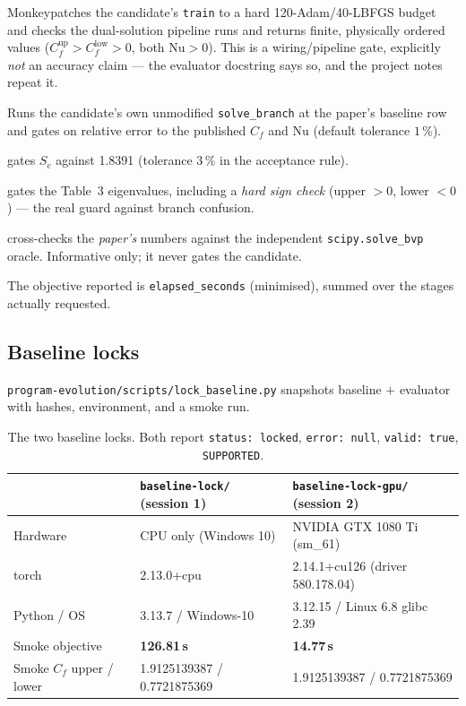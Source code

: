 \documentclass[11pt,a4paper]{article}
\newcommand{\code}[1]{\texttt{\small #1}}
\newcommand{\pct}{\,\%}
\begin{document}
\begin{description}[leftmargin=1.6em,itemsep=2pt]
  \item[\code{--mode smoke} (default, cheap).] Monkeypatches the candidate's \code{train}
        to a hard 120-Adam/40-LBFGS budget and checks the dual-solution pipeline runs and
        returns finite, physically ordered values ($C_f^{\mathrm{up}} > C_f^{\mathrm{low}} > 0$,
        both $\mathrm{Nu}>0$). This is a wiring/pipeline gate, explicitly \emph{not} an
        accuracy claim --- the evaluator docstring says so, and the project notes repeat it.
  \item[\code{--mode full} (expensive).] Runs the candidate's own unmodified
        \code{solve\_branch} at the paper's baseline row and gates on relative error to the
        published $C_f$ and $\mathrm{Nu}$ (default tolerance $1\pct$).
  \item[\code{--fold}] gates $S_c$ against 1.8391 (tolerance $3\pct$ in the acceptance rule).
  \item[\code{--stability}] gates the Table~3 eigenvalues, including a \emph{hard sign
        check} (upper $>0$, lower $<0$) --- the real guard against branch confusion.
  \item[\code{--oracle}] cross-checks the \emph{paper's} numbers against the independent
        \code{scipy.solve\_bvp} oracle. Informative only; it never gates the candidate.
\end{description}

\noindent The objective reported is \code{elapsed\_seconds} (minimised), summed over the
stages actually requested.

\subsection{Baseline locks}
\code{program-evolution/scripts/lock\_baseline.py} snapshots baseline $+$ evaluator with
hashes, environment, and a smoke run.

\begin{table}[ht]
\centering
\caption{The two baseline locks. Both report \code{status: locked}, \code{error: null},
\code{valid: true}, \code{SUPPORTED}.}
\label{tab:locks}
\small
\begin{tabular}{@{}lll@{}}
\toprule
 & \code{baseline-lock/} (session 1) & \code{baseline-lock-gpu/} (session 2) \\
\midrule
Hardware     & CPU only (Windows 10) & NVIDIA GTX 1080 Ti (sm\_61) \\
torch        & 2.13.0+cpu & 2.14.1+cu126 (driver 580.178.04) \\
Python / OS  & 3.13.7 / Windows-10 & 3.12.15 / Linux 6.8 glibc 2.39 \\
Smoke objective & \textbf{126.81\,s} & \textbf{14.77\,s} \\
Smoke $C_f$ upper / lower & 1.9125139387 / 0.7721875369 & 1.9125139387 / 0.7721875369 \\
\bottomrule
\end{tabular}
\end{table}
\end{document}
